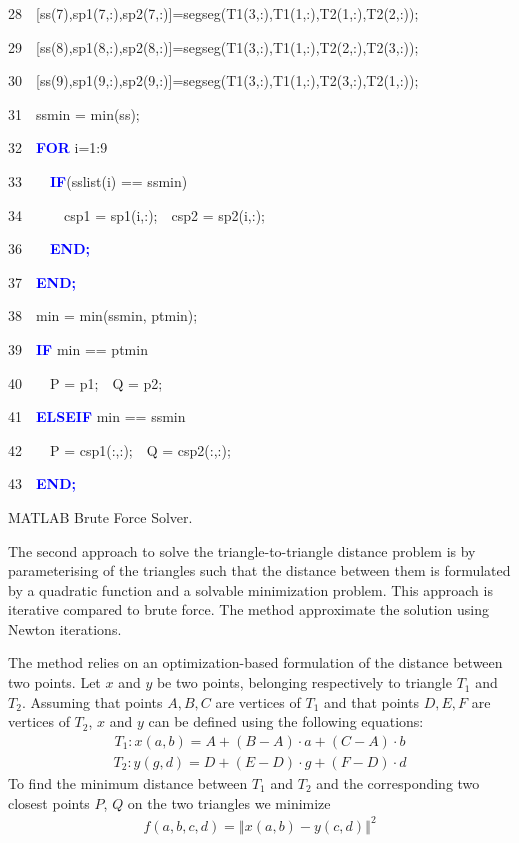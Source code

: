 \documentclass[times,12pt]{article}
\begin{document}
\begin{algorithm}
28~~[ss(7),sp1(7,:),sp2(7,:)]=segseg(T1(3,:),T1(1,:),T2(1,:),T2(2,:));

29~~[ss(8),sp1(8,:),sp2(8,:)]=segseg(T1(3,:),T1(1,:),T2(2,:),T2(3,:));

30~~[ss(9),sp1(9,:),sp2(9,:)]=segseg(T1(3,:),T1(1,:),T2(3,:),T2(1,:));

31~~ssmin = min(ss);

32~~\textbf{\textcolor{blue}{FOR}} i=1:9

33~~~~\textbf{\textcolor{blue}{IF}}(sslist(i) == ssmin)

34~~~~~~csp1 = sp1(i,:);~~csp2 = sp2(i,:);

36~~~~\textbf{\textcolor{blue}{END;}}

37~~\textbf{\textcolor{blue}{END;}}

38~~min = min(ssmin, ptmin);

39~~\textbf{\textcolor{blue}{IF}} min == ptmin

40~~~~P = p1;~~Q = p2;

41~~\textbf{\textcolor{blue}{ELSEIF}} min == ssmin

42~~~~P = csp1(:,:);~~Q = csp2(:,:);

43~~\textbf{\textcolor{blue}{END;}}
\protect\caption{\label{alg3}MATLAB Brute Force Solver.}
\end{algorithm}
\clearpage


The second approach to solve the triangle-to-triangle  distance problem is by parameterising of the triangles such that the distance between them is formulated by a quadratic function and a solvable minimization problem. This approach is iterative compared to brute force. The method approximate the solution using Newton iterations.

The method relies on an optimization-based formulation of the distance between two points. Let $x$ and $y$ be two points, belonging respectively to triangle $T_1$ and $T_2$. Assuming that points $A, B, C$ are vertices of $T_1$ and that points $D, E, F$ are vertices of $T_2$, $x$ and $y$ can be defined using the following equations: 
\begin{align*}
T_{1}:x(a,b)=A+(B-A) \cdot a+(C-A)\cdot b
\end{align*}
\begin{align*}
T_{2}:y(g,d)=D+(E-D) \cdot g+(F-D) \cdot d
\end{align*} 
To find the minimum distance between $T_1$ and $T_2$ and the corresponding two closest points $P$, $Q$ on the two triangles we minimize
\begin{align*}
f\left(a,b,c,d\right)=\left\Vert x\left(a,b\right)-y\left(c,d\right)\right\Vert ^{2}
\end{align*} 
\end{document}

